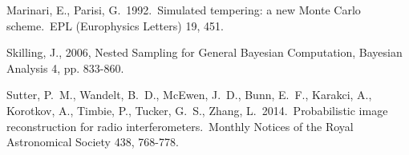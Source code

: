 \documentclass[
  ,final            %
  ]
  {aipproc}
\begin{document}
\begin{thebibliography}{9}
 Marinari, E., 
Parisi, G.\ 1992.\ Simulated tempering: a new Monte Carlo scheme.\ EPL 
(Europhysics Letters) 19, 451. 

 Skilling, J., 2006, Nested Sampling for General Bayesian Computation, Bayesian Analysis 4, pp. 833-860.

 Sutter, P.~M., Wandelt, 
B.~D., McEwen, J.~D., Bunn, E.~F., Karakci, A., Korotkov, A., Timbie, P., 
Tucker, G.~S., Zhang, L.\ 2014.\ Probabilistic image reconstruction for 
radio interferometers.\ Monthly Notices of the Royal Astronomical Society 
438, 768-778. 

\end{thebibliography}
\end{document}
